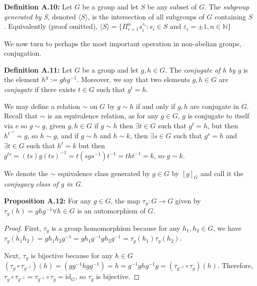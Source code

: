 \documentclass[12pt]{article}
\newcommand{\vs}{\vskip10pt}
\begin{document}
	\vs 
	
	\textbf{Definition A.10: } Let $G$ be a group and let $S$ be any subset of $G$. The \textit{subgroup generated by S}, denoted $\langle S \rangle$, is the intersection of all subgroups of $G$ containing $S$. Equivalently (proof omitted), $\langle S \rangle = \{\Pi_{i=1}^n s_i^{\varepsilon_i} : s_i \in S \text{ and } \varepsilon_i = \pm 1, n \in \mathbb{N}\}$
	
	\vs 
	
	We now turn to perhaps the most important operation in non-abelian groups, conjugation. 
	
	\vs 
	
	\textbf{Definition A.11: } Let $G$ be a group and let $g,h \in G$. The \textit{conjugate of h by g} is the element $h^g := ghg^{-1}$. Moreover, we say that two elements $g,h \in G$ are \textit{conjugate} if there exists $t \in G$ such that $g^t = h$. 
	
	\vs 
	
	We may define a relation $\sim$ on $G$ by $g \sim h$ if and only if $g,h$ are conjugate in $G$. Recall that $\sim$ is an equivalence relation, as for any $g \in G$, $g$ is conjugate to itself via $e$ so $g \sim g$, given $g,h \in G$ if $g \sim h$ then $\exists t \in G$ such that $g^t = h$, but then $h^{t^{-1}} = g$, so $h \sim g$, and if $g \sim h$ and $h \sim k$, then $\exists s \in G$ such that $g^s = h$ and $\exists t \in G$ such that $h^t = k$ but then $g^{ts} = (ts)g(ts)^{-1} = t(sgs^{-1})t^{-1} = tht^{-1} = k$, so $g \sim k$. 
	
	\vs 
	
	We denote the $\sim$ equivalence class generated by $g \in G$ by $[g]_G$ and call it the \textit{conjugacy class of g in G}. 
	
	\vs 
	
	\textbf{Proposition A.12: } For any $g \in G$, the map $\tau_g: G \rightarrow G$ given by $\tau_g(h) = ghg^{-1} \forall h \in G$ is an automorphism of $G$. 
	
	\begin{proof}
		
		First, $\tau_g$ is a group homomorphism because for any $h_1, h_2 \in G$, we have $\tau_g(h_1 h_2) = g h_1 h_2 g^{-1} = g h_1 g^{-1} g h_2 g^{-1} = \tau_g(h_1) \tau_g(h_2)$. 
		
		\vs 
		
		Next, $\tau_g$ is bijective because for any $h \in G$ $(\tau_g \circ \tau_{g^{-1}}) (h) = (g g^{-1} h g g^{-1}) = h = g^{-1} g h g^{-1} g = (\tau_{g^{-1}} \circ \tau_{g}) (h)$. Therefore, $\tau_g \circ \tau_{g^{-1}} = \tau_{g^{-1}} \circ \tau_g = \text{id}_G$, so $\tau_g$ is bijective. 
		
	\end{proof}
	
\end{document}
